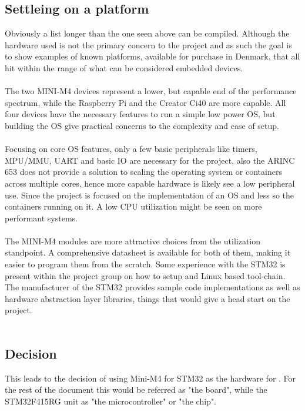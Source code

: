 \subsection{Settleing on a platform}\label{section:settleing_platform}
Obviously a list longer than the one seen above can be compiled.
Although the hardware used is not the primary concern to the project
and as such the goal is to show examples of known platforms,
available for purchase in Denmark,
that all hit within the range of what can be considered embedded devices.
\\\\
The two MINI-M4 devices represent a lower, but capable end of the performance spectrum,
while the Raspberry Pi and the Creator Ci40 are more capable.
All four devices have the necessary features to run a simple low power OS,
but building the OS give practical concerns to the complexity and ease of setup.
\\\\
Focusing on core OS features, only a few basic peripherals
like timers, MPU/MMU, UART and basic IO are necessary for the project,
also the ARINC 653 does not provide a solution to scaling the operating system
or containers across multiple cores,
hence more capable hardware is likely see a low peripheral use.
Since the project is focused on the implementation of an OS
and less so the containers running on it.
A low CPU utilization might be seen on more performant systems.
\\\\
The MINI-M4 modules are more attractive choices from the utilization standpoint.
A comprehensive datasheet is available for both of them,
making it easier to program them from the scratch.
Some experience with the STM32 is present within the project group
on how to setup and Linux based tool-chain. The manufacturer of the STM32
provides sample code implementations as well as hardware abstraction
layer libraries, things that would give a head start on the project.
\\\\

\subsection{Decision}
This leads to the decision of using Mini-M4 for STM32 as the hardware
for \OSname{}. For the rest of the document this would be referred as 
"the board", while the STM32F415RG unit as "the microcontroller" or
"the chip".

